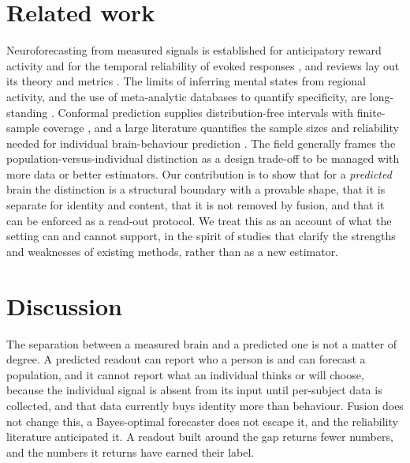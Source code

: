 \documentclass{article}
\begin{document}
\section{Related work}
\label{sec:related}
Neuroforecasting from measured signals is established for anticipatory reward activity and for the temporal
reliability of evoked responses \citep{knutson2007,genevsky2017,dmochowski2014}, and reviews lay out its
theory and metrics \citep{yao2024}. The limits of inferring mental states from regional activity, and the
use of meta-analytic databases to quantify specificity, are long-standing \citep{poldrack2006,hutzler2013}.
Conformal prediction supplies distribution-free intervals with finite-sample coverage \citep{vovk2005}, and
a large literature quantifies the sample sizes and reliability needed for individual brain-behaviour
prediction \citep{marek2022,kang2024,elliott2020,kragel2021,gordon2017,du2025}. The field generally frames
the population-versus-individual distinction as a design trade-off to be managed with more data or better
estimators. Our contribution is to show that for a \emph{predicted} brain the distinction is a structural
boundary with a provable shape, that it is separate for identity and content, that it is not removed by
fusion, and that it can be enforced as a read-out protocol. We treat this as an account of what the setting
can and cannot support, in the spirit of studies that clarify the strengths and weaknesses of existing
methods, rather than as a new estimator.

\section{Discussion}
\label{sec:discussion}
The separation between a measured brain and a predicted one is not a matter of degree. A predicted readout
can report who a person is and can forecast a population, and it cannot report what an individual thinks or
will choose, because the individual signal is absent from its input until per-subject data is collected, and
that data currently buys identity more than behaviour. Fusion does not change this, a Bayes-optimal
forecaster does not escape it, and the reliability literature anticipated it. A readout built around the gap
returns fewer numbers, and the numbers it returns have earned their label.
\end{document}
